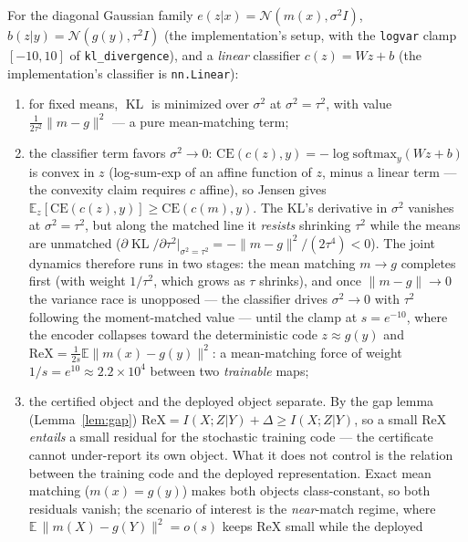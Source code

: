 \begin{proposition}\label{prop:variance}
For the diagonal Gaussian family $e(z|x) = \mathcal{N}(m(x), \sigma^2 I)$,
$b(z|y) = \mathcal{N}(g(y), \tau^2 I)$ (the implementation's setup, with the
\texttt{logvar} clamp $[-10, 10]$ of \texttt{kl\_divergence}), and a \emph{linear}
classifier $c(z) = Wz + b$ (the implementation's classifier is \texttt{nn.Linear}):
\begin{enumerate}
\item[(i)] for fixed means, $\operatorname{KL}$ is minimized over $\sigma^2$ at
$\sigma^2 = \tau^2$, with value $\tfrac{1}{2\tau^2}\|m - g\|^2$ --- a pure mean-matching
term;
\item[(ii)] the classifier term favors $\sigma^2 \to 0$:
$\mathrm{CE}(c(z), y) = -\log \mathrm{softmax}_y(Wz+b)$ is convex in $z$ (log-sum-exp
of an affine function of $z$, minus a linear term --- the convexity claim requires $c$
affine), so Jensen gives
$\mathbb{E}_z[\mathrm{CE}(c(z), y)] \ge \mathrm{CE}(c(m), y)$. The KL's derivative in
$\sigma^2$ vanishes at $\sigma^2 = \tau^2$, but along the matched line it \emph{resists}
shrinking $\tau^2$ while the means are unmatched
($\partial \operatorname{KL}/\partial \tau^2|_{\sigma^2=\tau^2}
= -\|m-g\|^2/(2\tau^4) < 0$). The joint dynamics therefore runs in two stages: the mean
matching $m \to g$ completes first (with weight $1/\tau^2$, which grows as $\tau$
shrinks), and once $\|m-g\| \to 0$ the variance race is unopposed --- the classifier
drives $\sigma^2 \to 0$ with $\tau^2$ following the moment-matched value --- until the
clamp at $s = e^{-10}$, where the encoder collapses toward the deterministic code
$z \approx g(y)$ and
$\mathrm{ReX} = \tfrac{1}{2s}\mathbb{E}\|m(x) - g(y)\|^2$: a mean-matching force of
weight $1/s = e^{10} \approx 2.2\times10^{4}$ between two \emph{trainable} maps;
\item[(iii)] the certified object and the deployed object separate. By the gap lemma
(Lemma~\ref{lem:gap}) $\mathrm{ReX} = I(X;Z|Y) + \Delta \ge I(X;Z|Y)$, so a small
$\mathrm{ReX}$ \emph{entails} a small residual for the stochastic training code --- the
certificate cannot under-report its own object. What it does not control is the relation
between the training code and the deployed representation. Exact mean matching
($m(x) = g(y)$) makes both objects class-constant, so both residuals vanish; the
scenario of interest is the \emph{near}-match regime, where
$\mathbb{E}\,\|m(X) - g(Y)\|^2 = o(s)$ keeps $\mathrm{ReX}$ small while the deployed

\end{enumerate}
\end{proposition}
